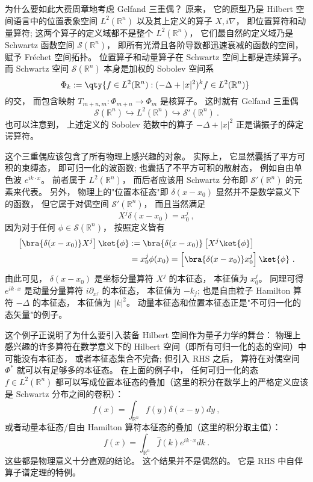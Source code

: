     为什么要如此大费周章地考虑 Gelfand 三重偶？ 原来， 它的原型乃是 Hilbert 空间语言中的位置表象空间 $L^2(\mathbb{R}^n)$ 以及其上定义的算子 $X,i\nabla$， 即位置算符和动量算符; 这两个算子的定义域都不是整个 $L^2(\mathbb{R}^n)$， 它们最自然的定义域乃是 Schwartz 函数空间 $\mathcal{S}(\mathbb{R}^n)$， 即所有光滑且各阶导数都迅速衰减的函数的空间， 赋予 Fréchet 空间拓扑。 位置算子和动量算子在 Schwartz 空间上都是连续算子。 而 Schwartz 空间 $\mathcal{S}(\mathbb{R}^n)$ 本身是加权的 Sobolev 空间系
$$
\Phi_k := \qty{f \in L^2 (\mathbb{R}^n): (-\Delta + |x|^ 2)^{k} f \in L^2 (\mathbb{R}^n) }~
$$
的交， 而包含映射 $T_{m+n,m}:\Phi_{m+n}\to\Phi_m$ 是核算子。 这时就有 Gelfand 三重偶$$
\mathcal{S}(\mathbb{R}^n)\hookrightarrow L^2(\mathbb{R}^n)\hookrightarrow \mathcal{S}'(\mathbb{R}^n)~.
$$也可以注意到， 上述定义的 Sobolev 范数中的算子 $-\Delta+|x|^2$ 正是谐振子的薛定谔算符。

    这个三重偶应该包含了所有物理上感兴趣的对象。 实际上， 它显然囊括了平方可积的束缚态， 即可归一化的波函数; 也囊括了不平方可积的散射态， 例如自由单色波 $e^{ik\cdot x}$。 前者属于 $L^2(\mathbb{R}^n)$， 而后者应该用 Schwartz 分布即 $\mathcal{S}'(\mathbb{R}^n)$ 的元素来代表。 另外， 物理上的"位置本征态"即 $\delta(x-x_0)$ 显然并不是数学意义下的函数， 但它属于对偶空间 $\mathcal{S}'(\mathbb{R}^n)$， 而且当然满足
$$
X^j\delta(x-x_0)=x_0^j~,
$$
因为对于任何 $\phi\in\mathcal{S}(\mathbb{R}^n)$， 按照定义皆有
$$
\begin{aligned}
\left[\bra{\delta(x-x_0)}X^j\right]\ket{\phi}
&:=\bra{\delta(x-x_0)}\left[X^j\ket{\phi}\right]\\
&=x_0^j\phi(x_0)
=\left[\bra{\delta(x-x_0)}x_0^j\right]\ket{\phi}~.
\end{aligned}
$$
由此可见， $\delta(x-x_0)$ 是坐标分量算符 $X^j$ 的本征态， 本征值为 $x_0^j$。 同理可得 $e^{ik\cdot x}$ 是动量分量算符 $i\partial_{x^j}$ 的本征态， 本征值为 $-k_j$; 也是自由粒子 Hamilton 算符 $-\Delta$ 的本征态， 本征值为 $|k|^2$。 动量本征态和位置本征态正是"不可归一化的态矢量"的例子。 

    这个例子正说明了为什么要引入装备 Hilbert 空间作为量子力学的舞台： 物理上感兴趣的许多算符在数学意义下的 Hilbert 空间（即所有可归一化的态的空间）中可能没有本征态， 或者本征态集合不完备; 但引入 RHS 之后， 算符在对偶空间 $\Phi^*$ 就可以有足够多的本征态。 在上面的例子中， 任何可归一化的态 $f\in{L^2}(\mathbb{R}^n)$ 都可以写成位置本征态的叠加（这里的积分在数学上的严格定义应该是 Schwartz 分布之间的卷积）：
$$
f(x)=\int_{\mathbb{R}^n}f(y)\delta(x-y)dy~,
$$    
或者动量本征态/自由 Hamilton 算符本征态的叠加（这里的积分取主值）：
$$
f(x)=\int_{\mathbb{R}^n}\hat f(k)e^{ik\cdot x}dk~.
$$
这些都是物理意义十分直观的结论。 这个结果并不是偶然的。 它是 RHS 中自伴算子谱定理的特例。
